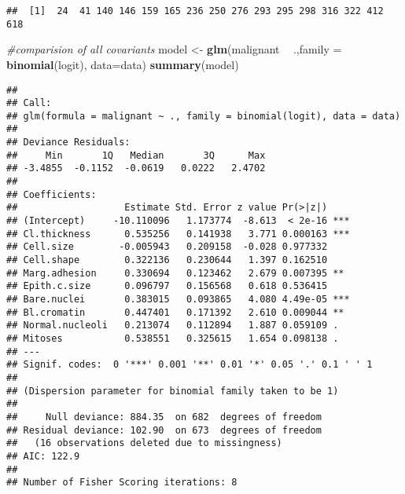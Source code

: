 \documentclass[
]{article}
\newenvironment{Shaded}{\begin{snugshade}}{\end{snugshade}}
\newcommand{\CommentTok}[1]{\textcolor[rgb]{0.56,0.35,0.01}{\textit{#1}}}
\newcommand{\DataTypeTok}[1]{\textcolor[rgb]{0.13,0.29,0.53}{#1}}
\newcommand{\KeywordTok}[1]{\textcolor[rgb]{0.13,0.29,0.53}{\textbf{#1}}}
\newcommand{\NormalTok}[1]{#1}
\newcommand{\OperatorTok}[1]{\textcolor[rgb]{0.81,0.36,0.00}{\textbf{#1}}}
\newcommand{\StringTok}[1]{\textcolor[rgb]{0.31,0.60,0.02}{#1}}
\begin{document}
\begin{verbatim}
##  [1]  24  41 140 146 159 165 236 250 276 293 295 298 316 322 412 618
\end{verbatim}

\begin{Shaded}
\begin{Highlighting}[]
\CommentTok{#comparision of all covariants }
\NormalTok{model <-}\StringTok{ }\KeywordTok{glm}\NormalTok{(malignant }\OperatorTok{~}\StringTok{ }\NormalTok{.,}\DataTypeTok{family =} \KeywordTok{binomial}\NormalTok{(logit), }\DataTypeTok{data=}\NormalTok{data)}
\KeywordTok{summary}\NormalTok{(model)}
\end{Highlighting}
\end{Shaded}

\begin{verbatim}
## 
## Call:
## glm(formula = malignant ~ ., family = binomial(logit), data = data)
## 
## Deviance Residuals: 
##     Min       1Q   Median       3Q      Max  
## -3.4855  -0.1152  -0.0619   0.0222   2.4702  
## 
## Coefficients:
##                   Estimate Std. Error z value Pr(>|z|)    
## (Intercept)     -10.110096   1.173774  -8.613  < 2e-16 ***
## Cl.thickness      0.535256   0.141938   3.771 0.000163 ***
## Cell.size        -0.005943   0.209158  -0.028 0.977332    
## Cell.shape        0.322136   0.230644   1.397 0.162510    
## Marg.adhesion     0.330694   0.123462   2.679 0.007395 ** 
## Epith.c.size      0.096797   0.156568   0.618 0.536415    
## Bare.nuclei       0.383015   0.093865   4.080 4.49e-05 ***
## Bl.cromatin       0.447401   0.171392   2.610 0.009044 ** 
## Normal.nucleoli   0.213074   0.112894   1.887 0.059109 .  
## Mitoses           0.538551   0.325615   1.654 0.098138 .  
## ---
## Signif. codes:  0 '***' 0.001 '**' 0.01 '*' 0.05 '.' 0.1 ' ' 1
## 
## (Dispersion parameter for binomial family taken to be 1)
## 
##     Null deviance: 884.35  on 682  degrees of freedom
## Residual deviance: 102.90  on 673  degrees of freedom
##   (16 observations deleted due to missingness)
## AIC: 122.9
## 
## Number of Fisher Scoring iterations: 8
\end{verbatim}

\begin{Shaded}
\end{Shaded}
\end{document}
